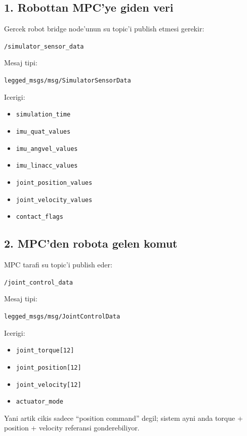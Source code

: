 \documentclass[11pt,a4paper]{article}
\begin{document}
\subsection*{1. Robottan MPC'ye giden veri}
Gercek robot bridge node'unun su topic'i publish etmesi gerekir:

\begin{center}
\texttt{/simulator\_sensor\_data}
\end{center}

Mesaj tipi:
\begin{center}
\texttt{legged\_msgs/msg/SimulatorSensorData}
\end{center}

Icerigi:
\begin{itemize}
  \item \texttt{simulation\_time}
  \item \texttt{imu\_quat\_values}
  \item \texttt{imu\_angvel\_values}
  \item \texttt{imu\_linacc\_values}
  \item \texttt{joint\_position\_values}
  \item \texttt{joint\_velocity\_values}
  \item \texttt{contact\_flags}
\end{itemize}

\subsection*{2. MPC'den robota gelen komut}
MPC tarafi su topic'i publish eder:

\begin{center}
\texttt{/joint\_control\_data}
\end{center}

Mesaj tipi:
\begin{center}
\texttt{legged\_msgs/msg/JointControlData}
\end{center}

Icerigi:
\begin{itemize}
  \item \texttt{joint\_torque[12]}
  \item \texttt{joint\_position[12]}
  \item \texttt{joint\_velocity[12]}
  \item \texttt{actuator\_mode}
\end{itemize}

Yani artik cikis sadece ``position command'' degil; sistem ayni anda torque + position + velocity referansi gonderebiliyor.
\end{document}
